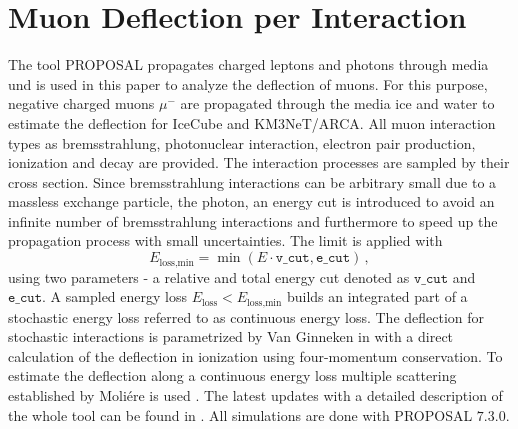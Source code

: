 \section{Muon Deflection per Interaction}\label{sec:defl_per_int}
The tool PROPOSAL propagates charged leptons and photons through media und is 
used in this paper to analyze the deflection of muons. For this purpose, 
negative charged muons $\mu^-$ are propagated through the media ice and water 
to estimate the deflection for IceCube and KM3NeT/ARCA. All muon interaction types as bremsstrahlung, photonuclear interaction, electron pair production, 
ionization and decay are provided. The interaction processes are sampled by their cross section. Since bremsstrahlung interactions can be 
arbitrary small due to a massless exchange particle, the photon, an energy cut is introduced to avoid an infinite number of bremsstrahlung interactions 
and furthermore to speed up the propagation process with small uncertainties.
The limit is applied with 
\begin{equation}
    E_{\text{loss,min}} = \min{(E \cdot \texttt{v\_cut}, \texttt{e\_cut})}\,,
\end{equation}
using two parameters - a relative and total energy cut denoted as 
$\texttt{v\_cut}$ and $\texttt{e\_cut}$. A sampled energy loss 
$E_{\text{loss}} < E_{\text{loss,min}}$ builds an integrated part of a 
stochastic energy loss referred to as continuous energy loss.
The deflection for stochastic interactions is parametrized by Van Ginneken 
in \cite{Van_Ginneken} with a direct calculation of the deflection in 
ionization using four-momentum conservation. To estimate the deflection along 
a continuous energy loss multiple scattering established by Moliére is used
\cite{moliere_scattering}. 
The latest updates with a detailed description of the whole tool can be found 
in \cite{phd_soedingrekso}.
All simulations are done with PROPOSAL $7.3.0$.

